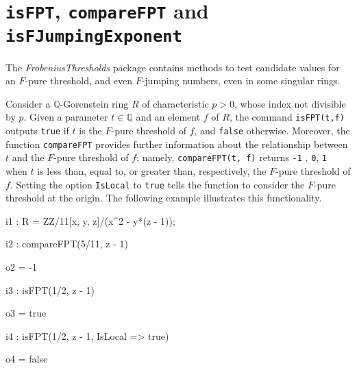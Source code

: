 \documentclass{amsart}
\begin{document}
%
%

\section{{\tt isFPT}, {\tt compareFPT} and {\tt isFJumpingExponent}}
\label{sec.IsFPT}

The \emph{FrobeniusThresholds} package contains methods to
 test candidate values for an $F$-pure threshold, and even $F$-jumping numbers, even in some singular rings.
 
Consider a  $\mathbb{Q}$-Gorenstein ring $R$ of characteristic $p>0$, whose index not divisible by $p$.
Given a parameter $t \in \mathbb{Q}$ and an element $f$ of $R$, the command {\tt isFPT(t,f)} outputs {\tt true} if $t$ is the $F$-pure threshold of $f$, and {\tt false} otherwise.
Moreover, the function {\tt compareFPT} provides further information about the relationship between $t$ and the $F$-pure threshold of $f$; namely,
{\tt compareFPT(t, f)} returns {\tt-1} , {\tt 0}, {\tt 1} when $t$ is less than, equal to, or greater than, respectively, the $F$-pure threshold of $f$.  Setting the option {\tt IsLocal} to {\tt true} tells the function to consider the $F$-pure threshold at the origin.  The following example illustrates this functionality.

{\small
{}
\begin{MyVerbatim}

i1 : R = ZZ/11[x, y, z]/(x^2 - y*(z - 1));

i2 : compareFPT(5/11, z - 1)

o2 = -1

i3 : isFPT(1/2, z - 1)

o3 = true

i4 : isFPT(1/2, z - 1, IsLocal => true)

o4 = false
\end{MyVerbatim}
}
\medspace
\end{document}
